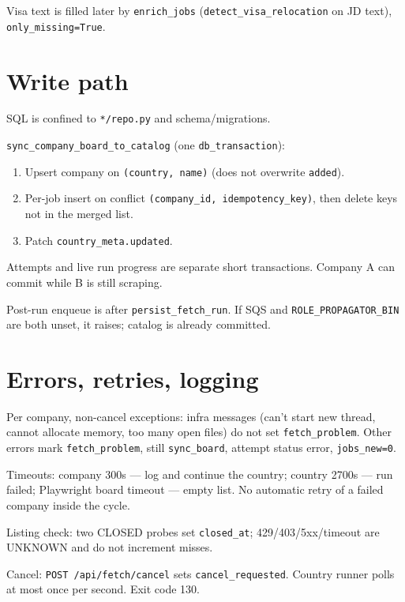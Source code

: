 \documentclass[11pt,a4paper]{article}
\begin{document}
Visa text is filled later by \texttt{enrich\_jobs}
(\texttt{detect\_visa\_relocation} on JD text), \texttt{only\_missing=True}.

\section{Write path}

SQL is confined to \texttt{*/repo.py} and schema/migrations.

\texttt{sync\_company\_board\_to\_catalog} (one \texttt{db\_transaction}):

\begin{enumerate}
  \item Upsert company on \texttt{(country, name)} (does not overwrite
        \texttt{added}).
  \item Per-job insert on conflict \texttt{(company\_id, idempotency\_key)},
        then delete keys not in the merged list.
  \item Patch \texttt{country\_meta.updated}.
\end{enumerate}

Attempts and live run progress are separate short transactions. Company A can
commit while B is still scraping.

Post-run enqueue is after \texttt{persist\_fetch\_run}. If SQS and
\texttt{ROLE\_PROPAGATOR\_BIN} are both unset, it raises; catalog is already
committed.

\section{Errors, retries, logging}

Per company, non-cancel exceptions: infra messages (can't start new thread,
cannot allocate memory, too many open files) do not set
\texttt{fetch\_problem}. Other errors mark \texttt{fetch\_problem}, still
\texttt{sync\_board}, attempt status error, \texttt{jobs\_new=0}.

Timeouts: company 300s --- log and continue the country; country 2700s --- run
failed; Playwright board timeout --- empty list. No automatic retry of a
failed company inside the cycle.

Listing check: two CLOSED probes set \texttt{closed\_at}; 429/403/5xx/timeout
are UNKNOWN and do not increment misses.

Cancel: \texttt{POST /api/fetch/cancel} sets \texttt{cancel\_requested}.
Country runner polls at most once per second. Exit code 130.
\end{document}
